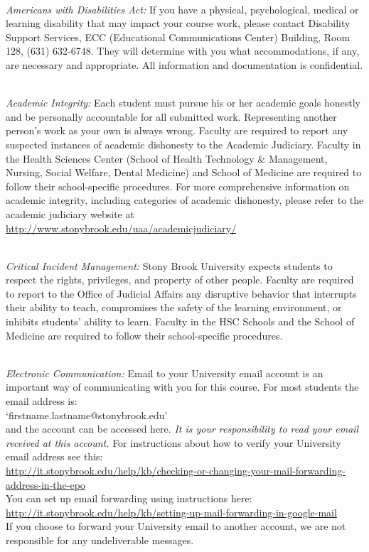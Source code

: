 \documentclass[11pt]{article}
\begin{document}
\clearpage
{} \\

\noindent
{\em Americans with Disabilities Act: } 
%
If you have a physical, psychological, medical or learning disability
that may impact your course work, please contact Disability Support
Services, ECC (Educational Communications Center) Building, Room 128,
(631) 632-6748. They will determine with you what accommodations, if
any, are necessary and appropriate. All information and documentation
is confidential.


\ \\[-1.5mm]
\noindent
{\em Academic Integrity: }
%
Each student must pursue his or her academic goals honestly and be
personally accountable for all submitted work.  Representing another
person's work as your own is always wrong.  Faculty are required to
report any suspected instances of academic dishonesty to the Academic
Judiciary. Faculty in the Health Sciences Center (School of Health
Technology \& Management, Nursing, Social Welfare, Dental Medicine) and
School of Medicine are required to follow their school-specific
procedures. For more comprehensive information on academic integrity,
including categories of academic dishonesty, please refer to the
academic judiciary website at
\url{http://www.stonybrook.edu/uaa/academicjudiciary/}

\ \\[-1.5mm]
\noindent
{\em Critical Incident Management: }
%
Stony Brook University expects students to respect the rights,
privileges, and property of other people. Faculty are required to
report to the Office of Judicial Affairs any disruptive behavior that
interrupts their ability to teach, compromises the safety of the
learning environment, or inhibits students' ability to learn.  Faculty
in the HSC Schools and the School of Medicine are required to follow
their school-specific procedures.

\ \\[-1.5mm]
{\em Electronic Communication: }
%
Email to your University email account is an important way of
communicating with you for this course.  For most students the email
address is:\\[0.25em] `firstname.lastname@stonybrook.edu'\\[0.25em]
and the account can be
accessed here.
{\em It is your responsibility to read your email received at this
  account.}
For instructions about how to verify your University email address see
this: \\[0.25em]
\url{http://it.stonybrook.edu/help/kb/checking-or-changing-your-mail-forwarding-address-in-the-epo} \\[0.25em]
%
You can set up email forwarding using instructions here: \\[0.25em]
\url{http://it.stonybrook.edu/help/kb/setting-up-mail-forwarding-in-google-mail}
\\[0.25em]
%
If you choose to forward your University email to another account, we
are not responsible for any undeliverable messages.
\end{document}
